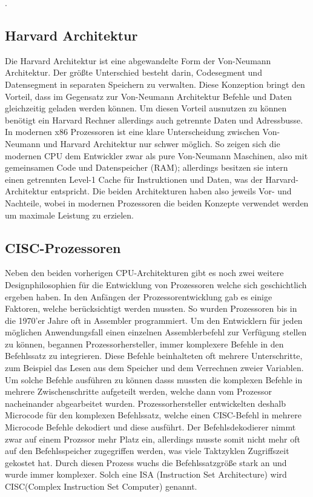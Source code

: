 \documentclass[12pt]{article}
\begin{document}
\cite{unikoelnvnz}.
\subsection{Harvard Architektur} 
Die Harvard Architektur ist eine abgewandelte Form der Von-Neumann Architektur. Der größte Unterschied besteht darin, Codesegment und Datensegment in separaten Speichern zu verwalten. Diese Konzeption bringt den Vorteil, dass im Gegensatz zur Von-Neumann Architektur Befehle und Daten gleichzeitig geladen werden können. Um diesen Vorteil ausnutzen zu können benötigt ein Harvard Rechner allerdings auch getrennte Daten und Adressbusse. 
\newline
\newline
In modernen x86 Prozessoren ist eine klare Unterscheidung zwischen Von-Neumann und Harvard Architektur nur schwer möglich. So zeigen sich die modernen CPU dem Entwickler zwar als pure Von-Neumann Maschinen, also mit gemeinsamen Code und Datenspeicher (RAM); allerdings besitzen sie intern einen getrennten Level-1 Cache für Instruktionen und Daten, was der Harvard-Architektur entspricht. Die beiden Architekturen haben also jeweils Vor- und Nachteile, wobei in modernen Prozessoren die beiden Konzepte verwendet werden um maximale Leistung zu erzielen.
\subsection{CISC-Prozessoren}
Neben den beiden vorherigen CPU-Architekturen gibt es noch zwei weitere Designphilosophien für die Entwicklung von Prozessoren welche sich geschichtlich ergeben haben. In den Anfängen der Prozessorentwicklung gab es einige Faktoren, welche berücksichtigt werden mussten. So wurden Prozessoren bis in die 1970'er Jahre oft in Assembler programmiert. Um den Entwicklern für jeden möglichen Anwendungsfall einen einzelnen Assemblerbefehl zur Verfügung stellen zu können, begannen Prozessorhersteller, immer komplexere Befehle in den Befehlssatz zu integrieren. Diese Befehle beinhalteten oft mehrere Unterschritte, zum Beispiel das Lesen aus dem Speicher und dem Verrechnen zweier Variablen. Um solche Befehle ausführen zu können dasss mussten die komplexen Befehle in mehrere Zwischenschritte aufgeteilt werden, welche dann vom Prozessor nacheinander abgearbeitet wurden. Prozessorhersteller entwickelten deshalb Microcode für den komplexen Befehlssatz, welche einen CISC-Befehl in mehrere Microcode Befehle dekodiert und diese ausführt. Der Befehlsdekodierer nimmt zwar auf einem Prozssor mehr Platz ein, allerdings musste somit nicht mehr oft auf den Befehlsspeicher zugegriffen werden, was viele Taktzyklen Zugriffszeit gekostet hat. Durch diesen Prozess wuchs die Befehlssatzgröße stark an und wurde immer komplexer. Solch eine ISA (Instruction Set Architecture) wird CISC(Complex Instruction Set Computer) genannt.	
\end{document}
